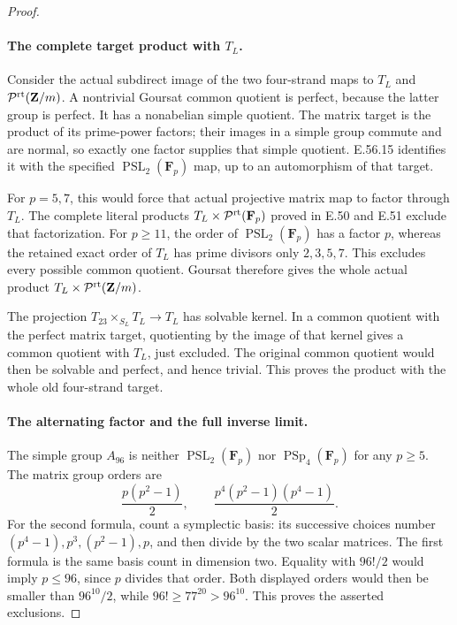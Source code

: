 \begin{proof}
\paragraph{The complete target product with $T_L$.}
Consider the actual subdirect image of the two
four-strand maps to $T_L$ and
$\mathcal P^{\rm rt}(\mathbf Z/m)$.
A nontrivial Goursat common quotient is perfect,
because the latter group is perfect. It has a
nonabelian simple quotient. The matrix target
is the product of its prime-power factors;
their images in a simple group commute and
are normal, so exactly one factor supplies
that simple quotient. E.56.15 identifies it
with the specified
$\operatorname{PSL}_2(\mathbf F_p)$ map, up
to an automorphism of that target.

For $p=5,7$, this would force that actual
projective matrix map to factor through
$T_L$. The complete literal products
$T_L\times\mathcal P^{\rm rt}(\mathbf F_p)$
proved in E.50 and E.51 exclude that factorization.
For $p\ge11$, the order of
$\operatorname{PSL}_2(\mathbf F_p)$ has a
factor $p$, whereas the retained exact order
of $T_L$ has prime divisors only $2,3,5,7$.
This excludes every possible common quotient.
Goursat therefore gives the whole actual
product $T_L\times\mathcal P^{\rm rt}(\mathbf Z/m)$.

The projection
$T_{23}\times_{S_L}T_L\to T_L$ has solvable
kernel. In a common quotient with the perfect
matrix target, quotienting by the image of
that kernel gives a common quotient with
$T_L$, just excluded. The original common
quotient would then be solvable and perfect,
and hence trivial. This proves the product
with the whole old four-strand target.

\paragraph{The alternating factor and the full inverse limit.}
The simple group $A_{96}$ is neither
$\operatorname{PSL}_2(\mathbf F_p)$ nor
$\operatorname{PSp}_4(\mathbf F_p)$ for any
$p\ge5$. The matrix group orders are
\[
 \frac{p(p^2-1)}2,\qquad
                 \frac{p^4(p^2-1)(p^4-1)}2.
 \tag{E.56.16}
\]
For the second formula, count a symplectic
basis: its successive choices number
$(p^4-1),p^3,(p^2-1),p$, and then divide by
the two scalar matrices. The first formula
is the same basis count in dimension two.
Equality with $96!/2$ would imply $p\le96$,
since $p$ divides that order. Both displayed
orders would then be smaller than $96^{10}/2$,
while $96!\ge77^{20}>96^{10}$.
This proves the asserted exclusions.


\end{proof}
